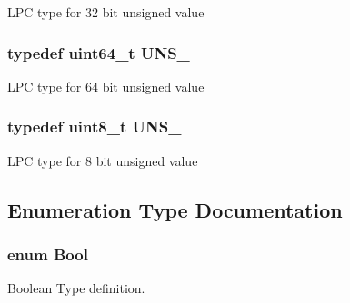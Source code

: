 L\-P\-C type for 32 bit unsigned value \hypertarget{group__LPC__Types__Public__Types_ga2299199b92f0535ad8c2e2d8c7c7f09b}{
\subsubsection[{U\-N\-S\-\_\-64}]{\setlength{\rightskip}{0pt plus 5cm}typedef uint64\-\_\-t {\bf U\-N\-S\-\_}}}\label{group__LPC__Types__Public__Types_ga2299199b92f0535ad8c2e2d8c7c7f09b}
L\-P\-C type for 64 bit unsigned value \hypertarget{group__LPC__Types__Public__Types_ga7353117656180c64d2216c874998b98b}{
\subsubsection[{U\-N\-S\-\_\-8}]{\setlength{\rightskip}{0pt plus 5cm}typedef uint8\-\_\-t {\bf U\-N\-S\-\_}}}\label{group__LPC__Types__Public__Types_ga7353117656180c64d2216c874998b98b}
L\-P\-C type for 8 bit unsigned value 

\subsection{Enumeration Type Documentation}
\hypertarget{group__LPC__Types__Public__Types_ga39db6982619d623273fad8a383489309}{
\subsubsection[{Bool}]{\setlength{\rightskip}{0pt plus 5cm}enum {\bf Bool}}}\label{group__LPC__Types__Public__Types_ga39db6982619d623273fad8a383489309}


Boolean Type definition. 


